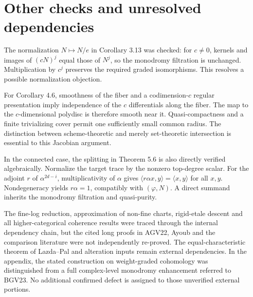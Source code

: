 \documentclass[10pt]{article}
\begin{document}
\section*{Other checks and unresolved dependencies}
The normalization \(N\mapsto N/e\) in Corollary 3.13 was checked: for \(c\ne0\), kernels and images of \((cN)^j\) equal those of \(N^j\), so the monodromy filtration is unchanged. Multiplication by \(c^j\) preserves the required graded isomorphisms. This resolves a possible normalization objection.\par
For Corollary 4.6, smoothness of the fiber and a codimension-\(c\) regular presentation imply independence of the \(c\) differentials along the fiber. The map to the \(c\)-dimensional polydisc is therefore smooth near it. Quasi-compactness and a finite trivializing cover permit one sufficiently small common radius. The distinction between scheme-theoretic and merely set-theoretic intersection is essential to this Jacobian argument.\par
In the connected case, the splitting in Theorem 5.6 is also directly verified algebraically. Normalize the target trace by the nonzero top-degree scalar. For the adjoint \(r\) of \(\alpha^{2d-i}\), multiplicativity of \(\alpha\) gives \(\langle r\alpha x,y\rangle=\langle x,y\rangle\) for all \(x,y\). Nondegeneracy yields \(r\alpha=1\), compatibly with \((\varphi,N)\). A direct summand inherits the monodromy filtration and quasi-purity.\par
The fine-log reduction, approximation of non-fine charts, rigid-etale descent and all higher-categorical coherence results were traced through the internal dependency chain, but the cited long proofs in AGV22, Ayoub and the comparison literature were not independently re-proved. The equal-characteristic theorem of Lazda–Pal and alteration inputs remain external dependencies. In the appendix, the stated construction on weight-graded cohomology was distinguished from a full complex-level monodromy enhancement referred to BGV23. No additional confirmed defect is assigned to those unverified external portions.\par
\end{document}
